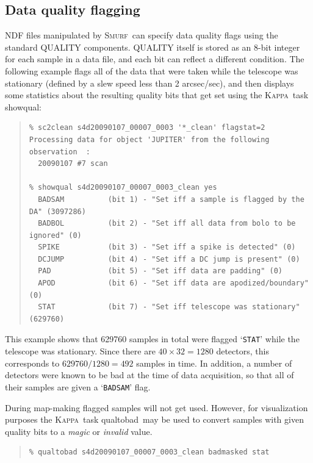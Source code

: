 \documentclass[twoside,11pt]{article}
\newenvironment{myquote}{\begin{quote}\begin{small}}{\end{small}\end{quote}}
\newcommand{\Kappa}{\xref{\textsc{Kappa}}{sun95}{}}
\newcommand{\smurf}{\xref{\textsc{Smurf}}{sun258}{}}
\newcommand{\task}[1]{\textsf{#1}}
\newcommand{\qualtobad}{\xref{\task{qualtobad}}{sun95}{QUALTOBAD}}
\newcommand{\showqual}{\xref{\task{showqual}}{sun95}{SHOWQUAL}}
\newcommand{\xref}[3]{#1}
\newcommand{\xlabel}[1]{}
\renewcommand{\_}{\texttt{\symbol{95}}}
\begin{document}
\subsection{\xlabel{quality}Data quality flagging} 

NDF files manipulated by \smurf\ can specify data quality flags using
the standard QUALITY components. QUALITY itself is stored as an 8-bit
integer for each sample in a data file, and each bit can reflect a
different condition. The following example flags all of the data that
were taken while the telescope was stationary (defined by a slew speed
less than 2 arcsec/sec), and then displays some statistics about the
resulting quality bits that get set using the \Kappa\ task \showqual:

\begin{myquote}
\begin{verbatim}
% sc2clean s4d20090107_00007_0003 '*_clean' flagstat=2
Processing data for object 'JUPITER' from the following observation  :
  20090107 #7 scan

% showqual s4d20090107_00007_0003_clean yes
  BADSAM          (bit 1) - "Set iff a sample is flagged by the DA" (3097286)
  BADBOL          (bit 2) - "Set iff all data from bolo to be ignored" (0)
  SPIKE           (bit 3) - "Set iff a spike is detected" (0)
  DCJUMP          (bit 4) - "Set iff a DC jump is present" (0)
  PAD             (bit 5) - "Set iff data are padding" (0)
  APOD            (bit 6) - "Set iff data are apodized/boundary" (0)
  STAT            (bit 7) - "Set iff telescope was stationary" (629760)
\end{verbatim}
\end{myquote}

This example shows that 629760 samples in total were flagged
`\texttt{STAT}' while the telescope was stationary. Since there are
$40\times32=1280$ detectors, this corresponds to $629760/1280=492$
samples in time. In addition, a number of detectors were known to be
bad at the time of data acquisition, so that all of their samples are
given a `\texttt{BADSAM}' flag.

During map-making flagged samples will not get used. However, for
visualization purposes the \Kappa\ task \qualtobad\ may be used to
convert samples with given quality bits to a {\em magic\/} or {\em
  invalid\/} value.

\begin{myquote}
\begin{verbatim}
% qualtobad s4d20090107_00007_0003_clean badmasked stat
\end{verbatim}
\end{myquote}
\end{document}
